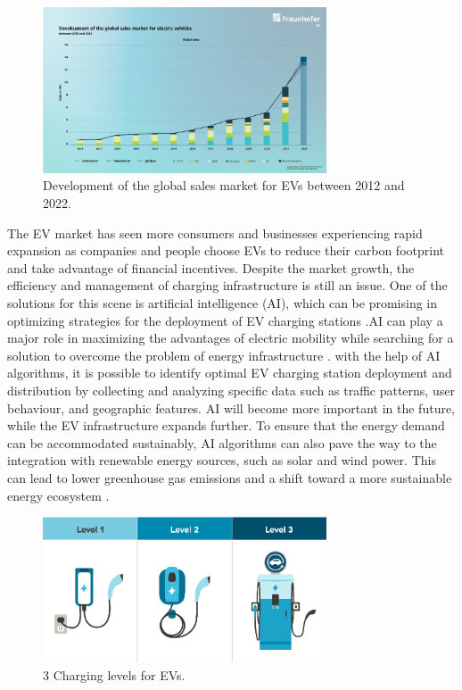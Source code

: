 \begin{figure}[htbp]
\begin{center}
\includegraphics[width=0.75\textwidth]{Bilder/[11].jpg}
\caption{Development of the global sales market for EVs between 2012 and 2022. \cite{Fraunhofer_Blog}}\label{fig:[11]}
\end{center}
\end{figure}


The EV market has seen more consumers and businesses experiencing rapid expansion as companies and people choose EVs to reduce their carbon footprint and take advantage of financial incentives. Despite the market growth, the efficiency and management of charging infrastructure is still an issue. One of the solutions for this scene is artificial intelligence (AI), which can be promising in optimizing strategies for the deployment of EV charging stations \cite{DunamisCharge_AI}.AI can play a major role in maximizing the advantages of electric mobility while searching for a solution to overcome the problem of energy infrastructure \cite{AfaxPower_AI}. with the help of AI algorithms, it is possible to identify optimal EV charging station deployment and distribution by collecting and analyzing specific data such as traffic patterns, user behaviour, and geographic features. AI will become more important in the future, while the EV infrastructure expands further. To ensure that the energy demand can be accommodated sustainably, AI algorithms can also pave the way to the integration with renewable energy sources, such as solar and wind power. This can lead to lower greenhouse gas emissions and a shift toward a more sustainable energy ecosystem \cite{EMobilityPlus_AI}. 
\\

\begin{figure}[H]
\begin{center}
\includegraphics[width=0.75\textwidth]{Bilder/[14].png}
\caption{3 Charging levels for EVs. \cite{EVChargingLevels}}\label{fig:[14]}
\end{center}
\end{figure}


